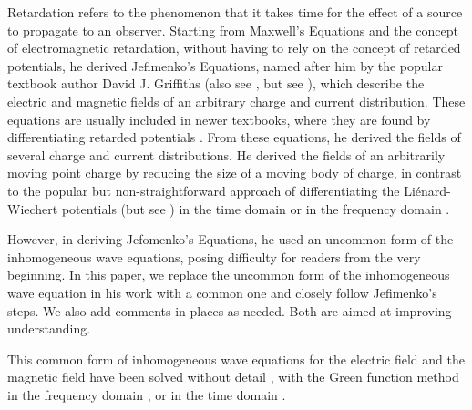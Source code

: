 \documentclass[11pt]{article}              %
\begin{document}
Retardation refers to the phenomenon that it takes time for the effect of a source to propagate to an observer. Starting from Maxwell's Equations and the concept of electromagnetic retardation, without having to rely on the concept of retarded potentials, he derived Jefimenko's Equations, named after him by the popular textbook author David J. Griffiths \cite{griffiths1999introduction}  (also see \cite{heald1995classical}, but see \cite{panofsky1962classical} \cite{mcdonald1997relation} \cite{zangwill2013modern} ), which describe the electric and magnetic fields of an arbitrary charge and current distribution. These equations are usually included in newer textbooks, where they are found by differentiating retarded potentials \cite{lorrain1988electromagnetic} \cite{jackson1998classical} \cite{griffiths1999introduction}  \cite{zangwill2013modern}. From these equations, he derived the fields of several charge and current distributions. He derived the fields of an arbitrarily moving point charge by reducing the size of a moving body of charge, in contrast to the popular but non-straightforward approach of differentiating the Li\'{e}nard-Wiechert potentials (but see \cite{page1922introduction}) in the time domain \cite{panofsky1962classical} \cite{matveyev1966principles} \cite{landau1971classical}   \cite{schwartz1972principles} \cite{reitz1979foundations} \cite{barut1980electrodynamics} \cite{becker1982electromagnetic} \cite{jackson1998classical} \cite{griffiths1999introduction} \cite{melia2001electrodynamics}  \cite{puri2011classical}  \cite{franklin2017classical}  \cite{davidson2019introduction} \cite{keohane2019introduction} or in the frequency domain \cite{podolsky1969fundamentals}.

However, in deriving Jefomenko's Equations, he used an uncommon form of the inhomogeneous wave equations, posing difficulty for readers from the very beginning. In this paper, we replace the uncommon form of the inhomogeneous wave equation in his work with a common one and closely follow Jefimenko's steps. We also add comments in places as needed. Both are aimed at improving understanding.

This common form of inhomogeneous wave equations for the electric field and the magnetic field have been solved without detail \cite{lorrain1988electromagnetic} \cite{mcdonald2018relation} , with the Green function method in the frequency domain \cite{eyges1972classical} \cite{jackson1998classical} \cite{brau2004modern},  or in the time domain \cite{leble2020practical}.
\end{document}
